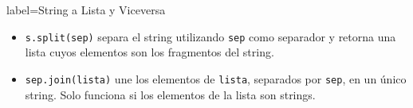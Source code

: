 \begin{contentbox}{label=String a Lista y Viceversa}
    \begin{itemize}
        \item \lstinline!s.split(sep)! separa el string utilizando \texttt{sep} como separador y retorna una lista cuyos elementos son los fragmentos del string.
        \item \lstinline!sep.join(lista)! une los elementos de \texttt{lista}, separados por \texttt{sep}, en un único string. Solo funciona si los elementos de la lista son strings.
    \end{itemize}
\end{contentbox}
